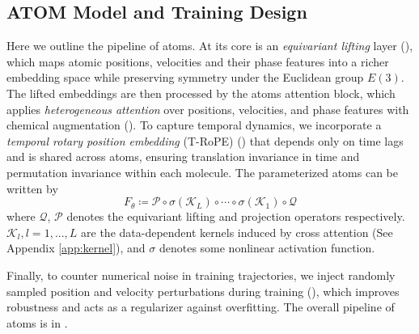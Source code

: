 \subsection{ATOM Model and Training Design}
\label{sect:main_model}


Here we outline the pipeline of \gls{atoms}. At its core is an \textit{equivariant lifting} layer (), which maps atomic positions, velocities and their phase features into a richer embedding space while preserving symmetry under the Euclidean group \(E(3)\). The lifted embeddings are then processed by the \gls{atoms} attention block, which applies \textit{heterogeneous attention} over positions, velocities, and phase features with chemical augmentation ().  To capture temporal dynamics, we incorporate a \textit{temporal rotary position embedding} (T-RoPE) () that depends only on time lags and is shared across atoms, ensuring translation invariance in time and permutation invariance within each molecule. {The parameterized \gls{atoms} can be written by 
\begin{equation*}
    F_\theta \coloneqq \mathcal{P} \circ \sigma(\mathcal{K}_L) \circ \cdots \circ \sigma(\mathcal{K}_1) \circ \mathcal{Q}
\end{equation*}
where $\mathcal{Q}$, $\mathcal{P}$ denotes the equivariant lifting and projection operators respectively. $\mathcal{K}_l, l = 1,..., L$ are the data-dependent kernels induced by cross attention (See Appendix \ref{app:kernel}), and $\sigma$ denotes some nonlinear activation function.
}


Finally, to counter numerical noise in training trajectories, we inject randomly sampled position and velocity perturbations during training (), which improves robustness and acts as a regularizer against overfitting. 
The overall pipeline of \gls{atoms} is in . 






